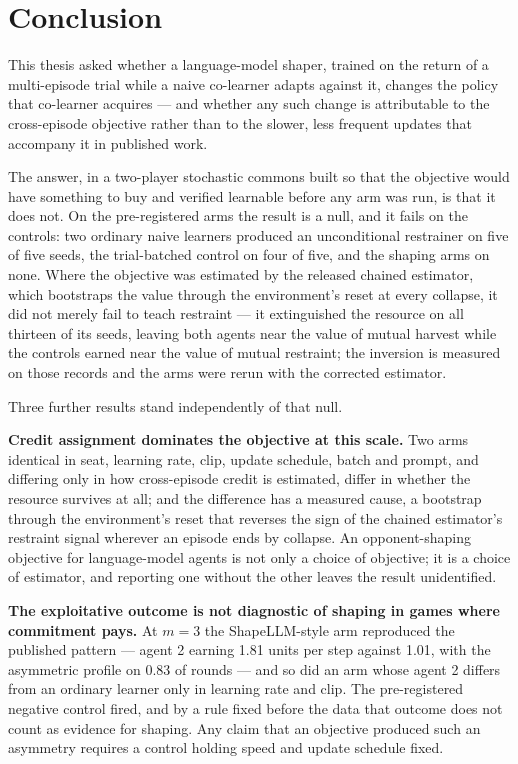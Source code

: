 \chapter{Conclusion}
\label{ch:conc}


This thesis asked whether a language-model shaper, trained on the return of
a multi-episode trial while a naive co-learner adapts against it, changes
the policy that co-learner acquires --- and whether any such change is
attributable to the cross-episode objective rather than to the slower,
less frequent updates that accompany it in published work.

The answer, in a two-player stochastic commons built so that the objective
would have something to buy and verified learnable before any arm was run,
is that it does not.
On the pre-registered arms the result is a null, and it fails on the
controls: two ordinary naive learners produced an unconditional restrainer
on five of five seeds, the trial-batched control on four of five, and the
shaping arms on none.
Where the objective was estimated by the released chained estimator, which
bootstraps the value through the environment's reset at every collapse, it
did not merely fail to teach restraint --- it extinguished the resource on
all thirteen of its seeds, leaving both agents near the value of mutual
harvest while the controls earned near the value of mutual restraint; the
inversion is measured on those records and the arms were rerun with the
corrected estimator.

Three further results stand independently of that null.

\textbf{Credit assignment dominates the objective at this scale.}
Two arms identical in seat, learning rate, clip, update schedule, batch and
prompt, and differing only in how cross-episode credit is estimated, differ
in whether the resource survives at all; and the difference has a measured
cause, a bootstrap through the environment's reset that reverses the sign
of the chained estimator's restraint signal wherever an episode ends by
collapse.
An opponent-shaping objective for language-model agents is not only a choice
of objective; it is a choice of estimator, and reporting one without the
other leaves the result unidentified.

\textbf{The exploitative outcome is not diagnostic of shaping in games where
commitment pays.}
At \(m=3\) the ShapeLLM-style arm reproduced the published pattern --- agent
2 earning 1.81 units per step against 1.01, with the asymmetric profile on
0.83 of rounds --- and so did an arm whose agent 2 differs from an ordinary
learner only in learning rate and clip.
The pre-registered negative control fired, and by a rule fixed before the
data that outcome does not count as evidence for shaping.
Any claim that an objective produced such an asymmetry requires a control
holding speed and update schedule fixed.

